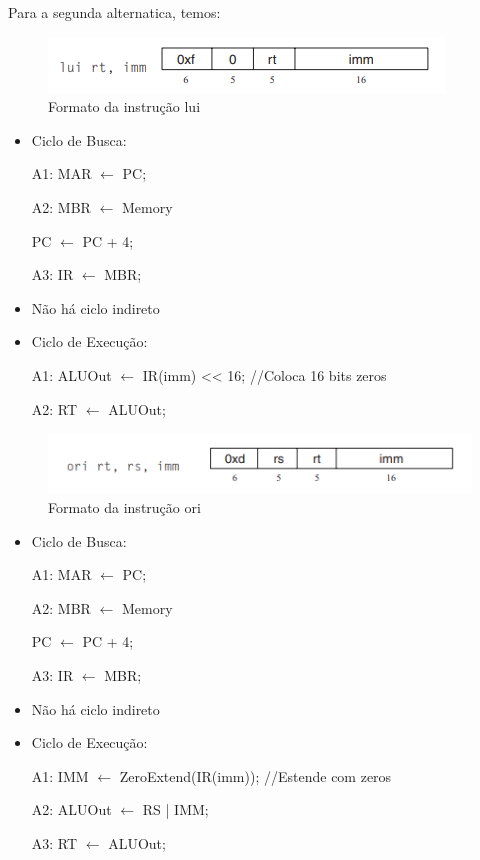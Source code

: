 \documentclass[
	12pt,				%
	oneside,			%
	a4paper,			%
	english,			%
	brazil				%
	]{abntex2ppgsi}
\begin{document}
Para a segunda alternatica, temos:

\begin{figure}[h]
    \centering
    \includegraphics{462.png}
    \caption{Formato da instrução lui}
    \label{fig462}
\end{figure}

\begin{itemize}
    \item Ciclo de Busca:

    A1: MAR $\leftarrow$ PC;

    A2: MBR $\leftarrow$ Memory 
    
       PC $\leftarrow$ PC + 4;

    A3: IR $\leftarrow$ MBR;
    
    \item Não há ciclo indireto
    \item Ciclo de Execução:

    A1: ALUOut $\leftarrow$ IR(imm) << 16; //Coloca 16 bits zeros

    A2: RT $\leftarrow$ ALUOut;

\end{itemize}

\begin{figure}[h]
    \centering
    \includegraphics{463.png}
    \caption{Formato da instrução ori}
    \label{fig463}
\end{figure}

\begin{itemize}
    \item Ciclo de Busca:
    
    A1: MAR $\leftarrow$ PC;

    A2: MBR $\leftarrow$ Memory 
    
       PC $\leftarrow$ PC + 4;

    A3: IR $\leftarrow$ MBR;

    \item Não há ciclo indireto
    \item Ciclo de Execução:

    A1: IMM $\leftarrow$ ZeroExtend(IR(imm)); //Estende com zeros
    
    A2: ALUOut $\leftarrow$ RS | IMM;
    
    A3: RT $\leftarrow$ ALUOut;
\end{itemize}
\end{document}
